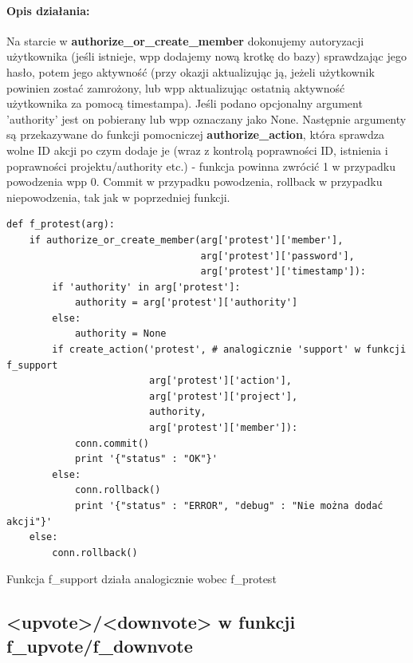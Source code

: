 \documentclass{article}
\begin{document}
\paragraph{Opis działania: }
Na starcie w \textbf{authorize\_or\_create\_member} dokonujemy autoryzacji użytkownika
(jeśli istnieje, wpp dodajemy nową krotkę do bazy) sprawdzając jego hasło, potem jego aktywność (przy okazji aktualizując ją, jeżeli użytkownik powinien zostać zamrożony, lub wpp aktualizując ostatnią aktywność użytkownika za pomocą timestampa). \newline
Jeśli podano opcjonalny argument 'authority' jest on pobierany lub wpp oznaczany jako None. Następnie argumenty są przekazywane do funkcji pomocniczej \textbf{authorize\_action}, która sprawdza wolne ID akcji po czym dodaje je (wraz z kontrolą poprawności ID, istnienia i poprawności projektu/authority etc.) - funkcja powinna zwrócić 1 w przypadku powodzenia wpp 0.\newline
Commit w przypadku powodzenia, rollback w przypadku niepowodzenia, tak jak w poprzedniej funkcji.
\begin{verbatim}
def f_protest(arg):
    if authorize_or_create_member(arg['protest']['member'],
                                  arg['protest']['password'],
                                  arg['protest']['timestamp']):  
        if 'authority' in arg['protest']: 
            authority = arg['protest']['authority']
        else: 
            authority = None
        if create_action('protest', # analogicznie 'support' w funkcji f_support 
                         arg['protest']['action'],
                         arg['protest']['project'],
                         authority,
                         arg['protest']['member']):
            conn.commit()
            print '{"status" : "OK"}'
        else: 
            conn.rollback()
            print '{"status" : "ERROR", "debug" : "Nie można dodać akcji"}'
    else:
        conn.rollback()
\end{verbatim}
Funkcja f\_support działa analogicznie wobec f\_protest






\newpage
\subsection{<upvote>/<downvote> w funkcji f\_upvote/f\_downvote }
\end{document}
